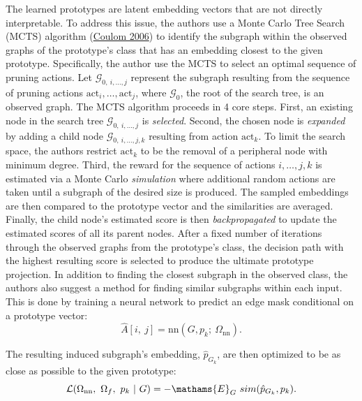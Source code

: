 \documentclass[
  11pt,
  letterpaper,
]{article}
\begin{document}
\quad The learned prototypes are latent embedding vectors that are not
directly interpretable. To address this issue, the authors use a Monte
Carlo Tree Search (MCTS) algorithm
(\protect\hyperlink{ref-Coulom2006EfficientSA}{Coulom 2006}) to identify
the subgraph within the observed graphs of the prototype's class that
has an embedding closest to the given prototype. Specifically, the
author use the MCTS to select an optimal sequence of pruning actions.
Let \(\mathcal{G}_{0, \ i, \dots, j}\) represent the subgraph resulting
from the sequence of pruning actions
\(\text{act}_i,\dots, \text{act}_j\), where \(\mathcal{G}_0\), the root
of the search tree, is an observed graph. The MCTS algorithm proceeds in
4 core steps. First, an existing node in the search tree
\(\mathcal{G}_{0, \ i, \dots, j}\) is \emph{selected}. Second, the
chosen node is \emph{expanded} by adding a child node
\(\mathcal{G}_{0, \ i, \dots, j, k}\) resulting from action
\(\text{act}_k\). To limit the search space, the authors restrict
\(\text{act}_k\) to be the removal of a peripheral node with minimum
degree. Third, the reward for the sequence of actions \(i, \dots, j, k\)
is estimated via a Monte Carlo \emph{simulation} where additional random
actions are taken until a subgraph of the desired size is produced. The
sampled embeddings are then compared to the prototype vector and the
similarities are averaged. Finally, the child node's estimated score is
then \emph{backpropagated} to update the estimated scores of all its
parent nodes. After a fixed number of iterations through the observed
graphs from the prototype's class, the decision path with the highest
resulting score is selected to produce the ultimate prototype
projection. In addition to finding the closest subgraph in the observed
class, the authors also suggest a method for finding similar subgraphs
within each input. This is done by training a neural network to predict
an edge mask conditional on a prototype vector:\\
\begin{equation}
        \hat A[i, \ j] = \text{nn}\left(G, p_k; \ \Omega_{\text{nn}}\right).  
    \end{equation}

The resulting induced subgraph's embedding, \(\hat p_{G_k}\), are then
optimized to be as close as possible to the given prototype:
\begin{equation}
        \mathcal{L}(\Omega_{\text{nn}}, \ \Omega_f, \ p_k \ | \ G) = -\mathams{E}_G \ sim(\hat p_{G_k}, p_k). 
    \end{equation}
\end{document}
